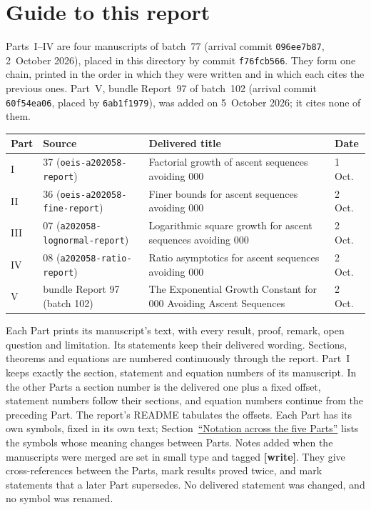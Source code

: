 \documentclass[11pt,letterpaper]{article}
\newcommand{\file}[1]{\nolinkurl{#1}}
\theoremstyle{remark}
\begin{document}
\section*{Guide to this report}\label{a58:sec:guide}
Parts~I--IV are four manuscripts of batch~77 (arrival commit \texttt{096ee7b87}, 2~October 2026), placed in this directory by commit \texttt{f76fcb566}. They form one chain, printed in the order in which they were written and in which each cites the previous ones. Part~V, bundle Report~97 of batch~102 (arrival commit \texttt{60f54ea06}, placed by \texttt{6ab1f1979}), was added on 5~October 2026; it cites none of them.
\begin{center}
\begin{tabular}{@{}l l >{\raggedright\arraybackslash}p{} l@{}}
\toprule
Part & Source & Delivered title & Date\\
\midrule
I & 37 (\file{oeis-a202058-report}) & Factorial growth of ascent sequences avoiding 000 & 1 Oct.\\
II & 36 (\file{oeis-a202058-fine-report}) & Finer bounds for ascent sequences avoiding 000 & 2 Oct.\\
III & 07 (\file{a202058-lognormal-report}) & Logarithmic square growth for ascent sequences avoiding 000 & 2 Oct.\\
IV & 08 (\file{a202058-ratio-report}) & Ratio asymptotics for ascent sequences avoiding 000 & 2 Oct.\\
V & bundle Report 97 (batch 102) & The Exponential Growth Constant for 000 Avoiding Ascent Sequences & 2 Oct.\\
\bottomrule
\end{tabular}
\end{center}
Each Part prints its manuscript's text, with every result, proof, remark, open question and limitation. Its statements keep their delivered wording. Sections, theorems and equations are numbered continuously through the report. Part~I keeps exactly the section, statement and equation numbers of its manuscript. In the other Parts a section number is the delivered one plus a fixed offset, statement numbers follow their sections, and equation numbers continue from the preceding Part. The report's README tabulates the offsets. Each Part has its own symbols, fixed in its own text; Section~\hyperref[a58:sec:notation]{``Notation across the five Parts''} lists the symbols whose meaning changes between Parts. Notes added when the manuscripts were merged are set in small type and tagged \textbf{[write]}. They give cross-references between the Parts, mark results proved twice, and mark statements that a later Part supersedes. No delivered statement was changed, and no symbol was renamed.
\end{document}
